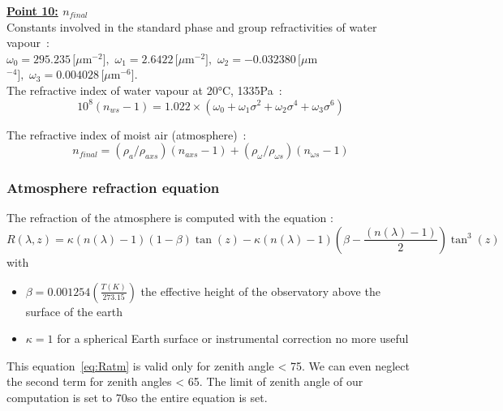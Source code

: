 \textbf{\underline{Point 10:} $n_{final}$}\\
Constants involved in the standard phase and group refractivities of water vapour~:\\
$\omega_0 = 295.235\,[\mu $m$^{-2}],\,\,\omega_1 = 2.6422\,[\mu $m$^{-2}],\,\,\omega_2 = -0.032380\,[\mu $m$^{-4}],\,\,\omega_3 = 0.004028\,[\mu$m$^{-6}]$.\\
The refractive index of water vapour at 20°C, 1335Pa~:
\begin{equation}
	10^8 \left(n_{ws}-1\right) = 1.022\times\left(\omega_0+\omega_1\sigma^2+\omega_2\sigma^4+\omega_3\sigma^6\right)
\end{equation}

The refractive index of moist air (atmosphere)~:
\begin{equation}
	n_{final} = \left(\rho_a / \rho_{axs}\right)\left(n_{axs}-1\right)+\left(\rho_\omega / \rho_{\omega s}\right)\left(n_{\omega s}-1\right)\label{eq:Ciddor_nprop}
\end{equation}



\subsubsection{Atmosphere refraction equation}
The refraction of the atmosphere is computed with the equation \cite{Stone1996}: 
\begin{equation}
	R(\lambda,z) = \kappa\left(n(\lambda)-1\right)\left(1-\beta\right)\tan(z) - \kappa\left(n(\lambda)-1\right)\left(\beta -\frac{\left(n(\lambda)-1\right)}{2}\right)\tan^3(z)\label{eq:Ratm}
\end{equation}
with 
\begin{itemize}
	\item $\beta = 0.001254\left(\frac{T(K)}{273.15}\right)$ the effective height of the observatory above the surface of the earth \cite{Stone1996}
	\item $\kappa = 1$ for a spherical Earth surface \cite{Stone1996} or instrumental correction no more useful \cite{Stone2002}
\end{itemize} 
This equation~\eqref{eq:Ratm} is valid only for zenith angle < 75\degree. We can even neglect the second term for zenith angles < 65\degree \cite{Tendulkar}. The limit of zenith angle of our computation is set to 70\degree so the entire equation is set.\\

